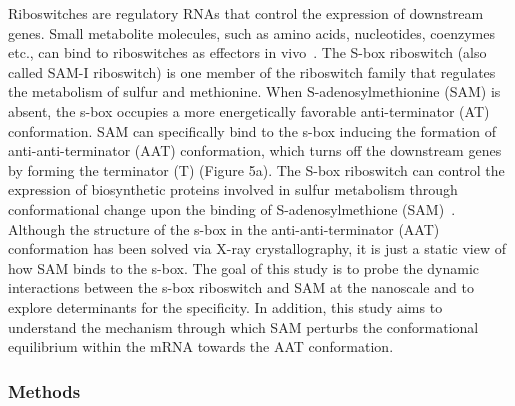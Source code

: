 \documentclass[a4paper,10pt]{article}
\begin{document}
Riboswitches are regulatory RNAs that control the expression of downstream genes. Small metabolite 
molecules, such as amino acids, nucleotides, coenzymes etc., can bind to riboswitches as effectors in  vivo~\cite{mandal}. 
The S-box riboswitch (also called SAM-I riboswitch) is one member of the riboswitch family that
regulates the metabolism of sulfur and methionine. 
When S-adenosylmethionine (SAM) is absent, the
s-box occupies a more energetically favorable anti-terminator (AT) conformation. SAM can
specifically bind to the s-box inducing the formation of anti-anti-terminator (AAT) conformation,
which turns off the downstream genes by forming the terminator (T) (Figure 5a).
The S-box riboswitch can control the expression of biosynthetic proteins involved in sulfur metabolism 
through conformational change upon the binding of S-adenosylmethione (SAM)~\cite{brooke}. Although the 
structure of the s-box in the anti-anti-terminator (AAT) conformation has been solved via X-ray 
crystallography, it is just a static view of how SAM binds to the s-box. The goal of this study is to probe 
the dynamic interactions between the s-box riboswitch and SAM at the nanoscale and to explore 
determinants for the specificity. In addition, this study aims to understand the mechanism through which 
SAM perturbs the conformational equilibrium within the mRNA towards the AAT conformation.

\subsubsection*{Methods}
\end{document}
